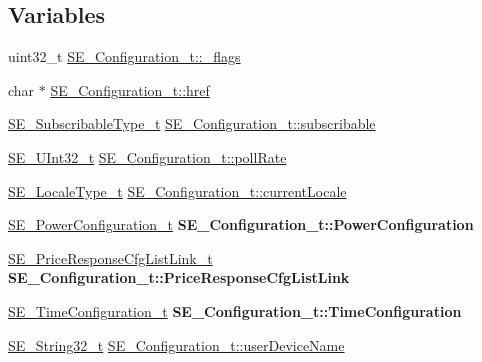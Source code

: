 \subsection*{Variables}
\begin{DoxyCompactItemize}
\item 
uint32\+\_\+t \hyperlink{group__Configuration_ga8a3ca98bd859b81b66d18b1e187c88d9}{S\+E\+\_\+\+Configuration\+\_\+t\+::\+\_\+flags}
\item 
char $\ast$ \hyperlink{group__Configuration_ga4e903b7cfa2e74aa671801bcb604387b}{S\+E\+\_\+\+Configuration\+\_\+t\+::href}
\item 
\hyperlink{group__SubscribableType_ga5c41f553d369710ed34619266bf2551e}{S\+E\+\_\+\+Subscribable\+Type\+\_\+t} \hyperlink{group__Configuration_ga314f37faa263874665349279e360400d}{S\+E\+\_\+\+Configuration\+\_\+t\+::subscribable}
\item 
\hyperlink{group__UInt32_ga70bd4ecda3c0c85d20779d685a270cdb}{S\+E\+\_\+\+U\+Int32\+\_\+t} \hyperlink{group__Configuration_gab33fe4f10250aa426acb5e134ab4cc0c}{S\+E\+\_\+\+Configuration\+\_\+t\+::poll\+Rate}
\item 
\hyperlink{group__LocaleType_gafbd2b639ff2cebd36ad75759203ee20c}{S\+E\+\_\+\+Locale\+Type\+\_\+t} \hyperlink{group__Configuration_gae45efe46ca71698cd46e1517aa7e8bae}{S\+E\+\_\+\+Configuration\+\_\+t\+::current\+Locale}
\item 
\mbox{\label{group__Configuration_ga398ef6cfdc707bb0a8031c6612a1b9eb}} 
\hyperlink{structSE__PowerConfiguration__t}{S\+E\+\_\+\+Power\+Configuration\+\_\+t} {\bfseries S\+E\+\_\+\+Configuration\+\_\+t\+::\+Power\+Configuration}
\item 
\mbox{\label{group__Configuration_ga33317df5ca07269728a973e762cf4ad2}} 
\hyperlink{structSE__PriceResponseCfgListLink__t}{S\+E\+\_\+\+Price\+Response\+Cfg\+List\+Link\+\_\+t} {\bfseries S\+E\+\_\+\+Configuration\+\_\+t\+::\+Price\+Response\+Cfg\+List\+Link}
\item 
\mbox{\label{group__Configuration_gafbefcf7a19886ea448cb399f1bec5ff7}} 
\hyperlink{structSE__TimeConfiguration__t}{S\+E\+\_\+\+Time\+Configuration\+\_\+t} {\bfseries S\+E\+\_\+\+Configuration\+\_\+t\+::\+Time\+Configuration}
\item 
\hyperlink{group__String32_gac9f59b06b168b4d2e0d45ed41699af42}{S\+E\+\_\+\+String32\+\_\+t} \hyperlink{group__Configuration_gae6dff21a0f541f054b5b0c53ea90b621}{S\+E\+\_\+\+Configuration\+\_\+t\+::user\+Device\+Name}
\end{DoxyCompactItemize}


